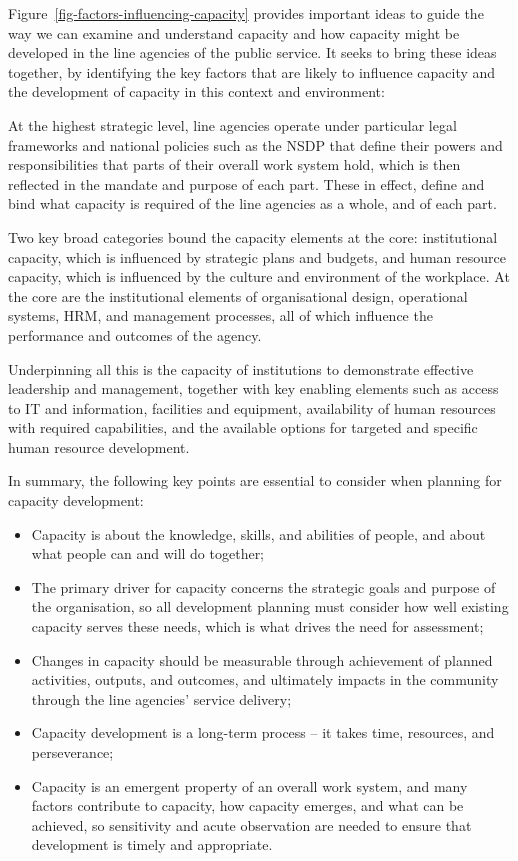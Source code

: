 \documentclass[
  10pt,
]{report}
\providecommand{\tightlist}{%
  \setlength{\itemsep}{0pt}\setlength{\parskip}{0pt}}
\begin{document}
Figure~\ref{fig-factors-influencing-capacity} provides important ideas
to guide the way we can examine and understand capacity and how capacity
might be developed in the line agencies of the public service. It seeks
to bring these ideas together, by identifying the key factors that are
likely to influence capacity and the development of capacity in this
context and environment:

At the highest strategic level, line agencies operate under particular
legal frameworks and national policies such as the NSDP that define
their powers and responsibilities that parts of their overall work
system hold, which is then reflected in the mandate and purpose of each
part. These in effect, define and bind what capacity is required of the
line agencies as a whole, and of each part.

Two key broad categories bound the capacity elements at the core:
institutional capacity, which is influenced by strategic plans and
budgets, and human resource capacity, which is influenced by the culture
and environment of the workplace. At the core are the institutional
elements of organisational design, operational systems, HRM, and
management processes, all of which influence the performance and
outcomes of the agency.

Underpinning all this is the capacity of institutions to demonstrate
effective leadership and management, together with key enabling elements
such as access to IT and information, facilities and equipment,
availability of human resources with required capabilities, and the
available options for targeted and specific human resource development.

In summary, the following key points are essential to consider when
planning for capacity development:

\begin{itemize}
\tightlist
\item
  Capacity is about the knowledge, skills, and abilities of people, and
  about what people can and will do together;
\item
  The primary driver for capacity concerns the strategic goals and
  purpose of the organisation, so all development planning must consider
  how well existing capacity serves these needs, which is what drives
  the need for assessment;
\item
  Changes in capacity should be measurable through achievement of
  planned activities, outputs, and outcomes, and ultimately impacts in
  the community through the line agencies' service delivery;
\item
  Capacity development is a long-term process -- it takes time,
  resources, and perseverance;
\item
  Capacity is an emergent property of an overall work system, and many
  factors contribute to capacity, how capacity emerges, and what can be
  achieved, so sensitivity and acute observation are needed to ensure
  that development is timely and appropriate.
\end{itemize}
\end{document}

